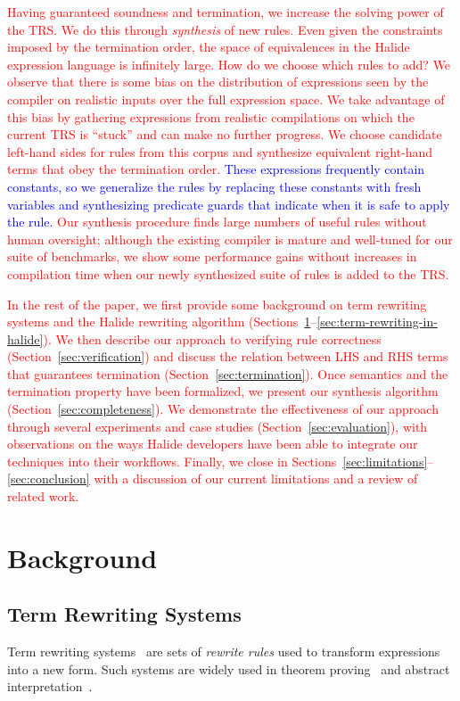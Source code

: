 \documentclass[acmsmall,review]{acmart}\settopmatter{printfolios=true,printccs=false,printacmref=false}
\newcommand{\modified}[1]{\textcolor{red}{{#1}}}
\newcommand{\modifiedagain}[1]{\textcolor{blue}{{#1}}}
\begin{document}
\modified{Having guaranteed soundness and termination, we increase 
the solving power of the TRS. We do this through \emph{synthesis} of new rules. Even
given the constraints imposed by the termination order, the space of equivalences 
in the Halide expression language is infinitely large. How do we choose which  
rules to add? We observe that there is some bias on the distribution of expressions 
seen by the compiler on realistic inputs over the full expression space. We take advantage 
of this bias by gathering expressions from realistic compilations on which the current 
TRS is ``stuck'' and can make no further progress. We choose candidate left-hand sides 
for rules from this corpus and synthesize equivalent right-hand terms that obey the 
termination order. \modifiedagain{These expressions frequently contain constants, so we
generalize the rules by replacing these constants
with fresh variables and synthesizing predicate guards that indicate when it is safe to apply 
the rule.} Our synthesis procedure finds large numbers of useful rules without
human oversight; although the existing compiler is mature 
and well-tuned for our suite of benchmarks, we show some performance 
gains without increases in compilation time when our newly synthesized suite 
of rules is added to the TRS. }


\modified{In the rest of the paper, we first provide some background on term rewriting systems 
and the Halide rewriting algorithm (Sections~\ref{sec:background}--\ref{sec:term-rewriting-in-halide}).
We then describe our approach to verifying
rule correctness (Section~\ref{sec:verification}) and discuss the relation between LHS and RHS terms that guarantees 
termination (Section~\ref{sec:termination}). Once semantics and the termination property have been formalized, 
we present our synthesis algorithm (Section~\ref{sec:completeness}). We demonstrate the effectiveness of our approach 
through several experiments and case studies (Section~\ref{sec:evaluation}), with observations on the ways Halide developers 
have been able to integrate our techniques into their workflows. Finally, we close in Sections~\ref{sec:limitations}--\ref{sec:conclusion}
 with a discussion of our current limitations and a review of related work.}


\section{Background}
\label{sec:background}
\subsection{Term Rewriting Systems}
Term rewriting systems~\cite{gorn1967} are sets of \textit{rewrite rules} used to transform expressions into a new form.  Such systems are widely
used in theorem proving~\cite{baader1999term} and abstract interpretation~\cite{cousot1977abstract, cousot1979systematic}.
\end{document}
